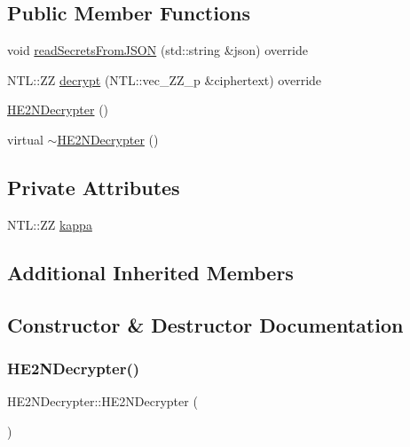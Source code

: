 \subsection*{Public Member Functions}
\begin{DoxyCompactItemize}
\item 
void \hyperlink{classHE2NDecrypter_a92b463d8e18d2f06d0680528edfd49c4}{read\+Secrets\+From\+J\+S\+ON} (std\+::string \&json) override
\item 
N\+T\+L\+::\+ZZ \hyperlink{classHE2NDecrypter_aa92e4ddf62a0f2c4199722983e28b0c9}{decrypt} (N\+T\+L\+::vec\+\_\+\+Z\+Z\+\_\+p \&ciphertext) override
\item 
\hyperlink{classHE2NDecrypter_a079e13cfaf35e9f4b32d4301960c6816}{H\+E2\+N\+Decrypter} ()
\item 
virtual \hyperlink{classHE2NDecrypter_a2046b9ecd1f5de52fe99477859b23947}{$\sim$\+H\+E2\+N\+Decrypter} ()
\end{DoxyCompactItemize}
\subsection*{Private Attributes}
\begin{DoxyCompactItemize}
\item 
N\+T\+L\+::\+ZZ \hyperlink{classHE2NDecrypter_ad3233fd048ef07f31e4f40ea941cce91}{kappa}
\end{DoxyCompactItemize}
\subsection*{Additional Inherited Members}


\subsection{Constructor \& Destructor Documentation}
\mbox{\label{classHE2NDecrypter_a079e13cfaf35e9f4b32d4301960c6816}} 
\subsubsection{\texorpdfstring{H\+E2\+N\+Decrypter()}{HE2NDecrypter()}}
{\footnotesize\ttfamily H\+E2\+N\+Decrypter\+::\+H\+E2\+N\+Decrypter (\begin{DoxyParamCaption}{ }\end{DoxyParamCaption})}

